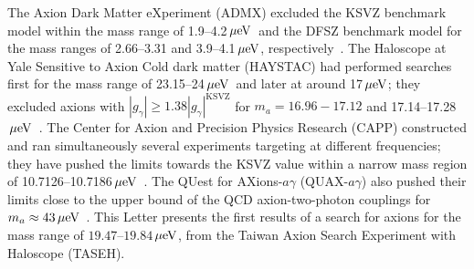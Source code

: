 \documentclass[%
 reprint,prl, %
 amsmath,amssymb,
 aps,
]{revtex4-2}
\newcommand{\ggamma}{\ensuremath{\left|g_{\gamma}\right|}}
\newcommand{\muevcc}{\ensuremath{\,\mu\text{e\hspace{-.08em}V}}}
\newcommand{\mlo}{\ensuremath{19.47}}
\newcommand{\mhi}{\ensuremath{19.84}}
\begin{document}
The Axion Dark Matter eXperiment (ADMX) excluded the KSVZ 
benchmark model within the mass range of 
1.9--4.2\muevcc\ and the DFSZ benchmark model for the mass ranges 
of 2.66--3.31 and 3.9--4.1\muevcc, 
respectively~\cite{ADMXI,ADMXII,ADMXIII,ADMXIV,ADMXV,ADMXVI,ADMXVII}. 
The Haloscope at Yale Sensitive to Axion Cold dark matter 
(HAYSTAC) had performed searches first for the mass range of 
23.15--24\muevcc\ and later at around 17\muevcc; they excluded axions 
with $\ggamma\geq 1.38 \ggamma^\text{KSVZ}$ for $m_a=16.96-17.12$ and 
17.14--17.28\muevcc~\cite{HAYSTACI}. The Center 
for Axion and Precision Physics Research (CAPP) constructed 
and ran simultaneously several experiments targeting at 
different frequencies; they have pushed the limits towards the 
KSVZ value within a narrow mass region of 
10.7126--10.7186\muevcc~\cite{CAPPI}.
The QUest for AXions-$a\gamma$ (QUAX-$a\gamma$) also pushed their limits 
close to the upper bound of the QCD axion-two-photon couplings for 
$m_a\approx43\muevcc$~\cite{QUAX}.   
%
This Letter presents the first results 
of a search for axions for the mass range of \mlo--\mhi\muevcc, 
from the Taiwan Axion Search Experiment with Haloscope (TASEH). 


\end{document}
